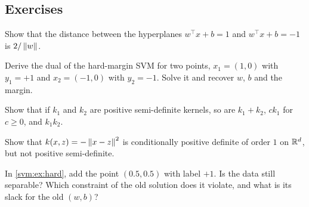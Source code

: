 \begin{notechapter}
\section*{Exercises}

\begin{exercise}\label{svm:exr:1}
Show that the distance between the hyperplanes $w^\top x + b = 1$ and $w^\top x + b = -1$ is $2/\left\|w\right\|$.
\end{exercise}

\begin{exercise}\label{svm:exr:2}
Derive the dual of the hard-margin SVM for two points, $x_1 = (1, 0)$ with $y_1 = +1$ and
$x_2 = (-1, 0)$ with $y_2 = -1$. Solve it and recover $w$, $b$ and the margin.
\end{exercise}

\begin{exercise}\label{svm:exr:3}
Show that if $k_1$ and $k_2$ are positive semi-definite kernels, so are $k_1 + k_2$, $ck_1$ for $c\geq0$,
and $k_1k_2$.
\end{exercise}

\begin{exercise}\label{svm:exr:4}
Show that $k(x, z) = -\left\|x - z\right\|^2$ is conditionally positive definite of order $1$ on $\mathbb{R}^d$, but not
positive semi-definite.
\end{exercise}

\begin{exercise}\label{svm:exr:5}
In \cref{svm:ex:hard}, add the point $(0.5, 0.5)$ with label $+1$. Is the data still separable?
Which constraint of the old solution does it violate, and what is its slack for the old
$(w, b)$?
\end{exercise}
\end{notechapter}
